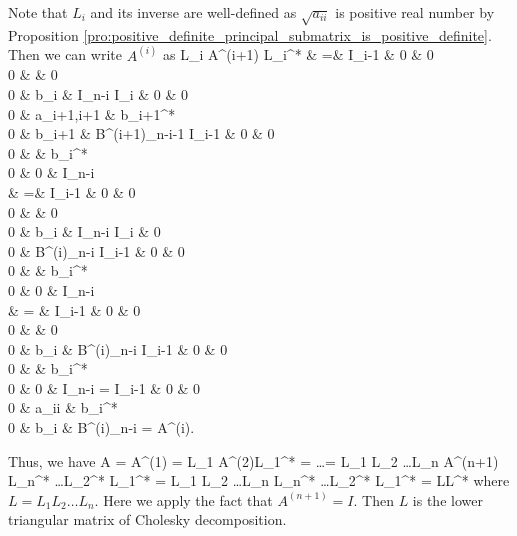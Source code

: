\begin{algorithm}
Note that $L_i$ and its inverse are well-defined as $\sqrt{a_{ii}}$ is positive real number by Proposition \ref{pro:positive_definite_principal_submatrix_is_positive_definite}. Then we can write $A^{(i)}$ as
\beast
 L_i A^{(i+1)} L_i^* & =&
\bepm
I_{i-1} & 0 & 0 \\
0 &  & 0 \\
0 & b_i & I_{n-i}
\eepm
\bepm
I_{i} & 0 & 0\\
0 & a_{i+1,i+1} & b_{i+1}^* \\
0 & b_{i+1} & B^{(i+1)}_{n-i-1}
\eepm
\bepm
I_{i-1} & 0 & 0 \\
0 &  & b_i^* \\
0 & 0 & I_{n-i}
\eepm \\
& =&
\bepm
I_{i-1} & 0 & 0 \\
0 &  & 0 \\
0 & b_i & I_{n-i}
\eepm
\bepm
I_{i} & 0 \\
0 & B^{(i)}_{n-i}
\eepm
\bepm
I_{i-1} & 0 & 0 \\
0 &  & b_i^* \\
0 & 0 & I_{n-i}
\eepm \\
& = &  \bepm
I_{i-1} & 0 & 0 \\
0 &  & 0 \\
0 & b_i & B^{(i)}_{n-i}
\eepm
\bepm
I_{i-1} & 0 & 0 \\
0 &  & b_i^* \\
0 & 0 & I_{n-i}
\eepm = \bepm
I_{i-1} & 0 & 0\\
0 & a_{ii} & b_i^* \\
0 & b_i & B^{(i)}_{n-i}
\eepm = A^{(i)}.
\eeast

Thus, we have
\be
A = A^{(1)} = L_1 A^{(2)}L_1^* = \dots = L_1 L_2 \dots L_n A^{(n+1)} L_n^* \dots L_2^* L_1^* = L_1 L_2 \dots L_n L_n^* \dots L_2^* L_1^* = LL^*
\ee
where $L = L_1 L_2 \dots L_n$. Here we apply the fact that $A^{(n+1)} = I$. Then $L$ is the lower triangular matrix of Cholesky decomposition.
\end{algorithm}

